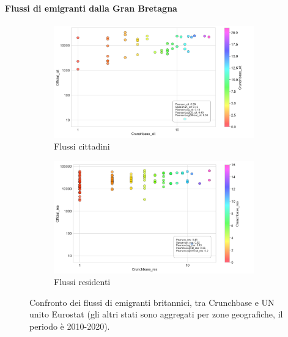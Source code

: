 \paragraph{Flussi di emigranti dalla Gran Bretagna}
\label{gbr_flows}
\begin{figure}[!ht]
    \centering
    \begin{subfigure}{\textwidth}
        \centering
        \includegraphics[width=0.95\textwidth]{images/flows/aggregated/filtered_nationality/gbr/Official_cit_True.png}
        \caption{Flussi cittadini}
        \label{fig:gbr_nat_true}
    \end{subfigure}
    \begin{subfigure}{\textwidth}
        \centering
        \includegraphics[width=0.95\textwidth]{images/flows/aggregated/filtered_nationality/gbr/Official_res_True.png}
        \caption{Flussi residenti}
        \label{fig:gbr_res_true}
    \end{subfigure}
    \caption{Confronto dei flussi di emigranti britannici, tra Crunchbase e UN unito Eurostat (gli altri stati sono aggregati per zone geografiche, il periodo è 2010-2020).}
    \label{fig:gbr_True}
\end{figure}
